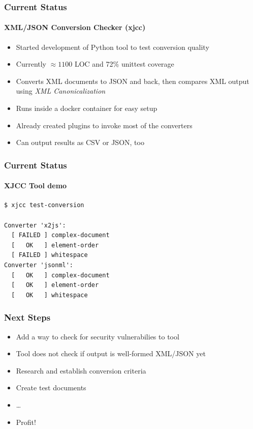 \documentclass[
    alternativetitlepage=bild,
    cornerlogo=hgi_nds_logo2,
    sectionoverview,
]{rubpresentation}
\begin{document}
\begin{frame}[plain]
    \frametitle{Current Status}
    \framesubtitle{XML/JSON Conversion Checker (xjcc)}
    \begin{itemize}
        \item{} Started development of Python tool to test conversion quality
        \item{} Currently $\approx 1100$ LOC and 72\% unittest coverage
        \item{} Converts XML documents to JSON and back, then compares XML output using \emph{XML Canonicalization}
        \item{} Runs inside a docker container for easy setup
        \item{} Already created plugins to invoke most of the converters
        \item{} Can output results as CSV or JSON, too
    \end{itemize}
\end{frame}

\begin{frame}
    \frametitle{Current Status}
    \framesubtitle{XJCC Tool demo}

    \begin{lstlisting}
$ xjcc test-conversion

Converter 'x2js':
  [ FAILED ] complex-document
  [   OK   ] element-order
  [ FAILED ] whitespace
Converter 'jsonml':
  [   OK   ] complex-document
  [   OK   ] element-order
  [   OK   ] whitespace
    \end{lstlisting}
\end{frame}

\begin{frame}[plain]
    \frametitle{Next Steps}
    \begin{itemize}
        \item{} Add a way to check for security vulnerabilies to tool
        \item{} Tool does not check if output is well-formed XML/JSON yet
        \item{} Research and establish conversion criteria
        \item{} Create test documents
        \item{} \dots
        \item{} Profit!
    \end{itemize}
\end{frame}

\end{document}
